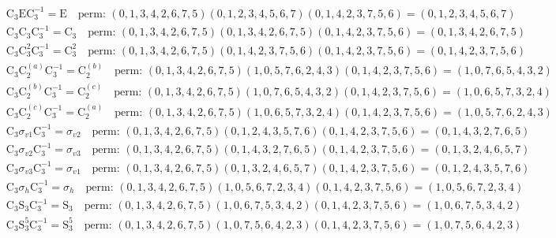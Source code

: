 \begin{align*}
& \mathrm{C}_{3} \mathrm{E} \mathrm{C}_{3}^{-1} = \mathrm{E} \quad \text{perm: }(0, 1, 3, 4, 2, 6, 7, 5)(0, 1, 2, 3, 4, 5, 6, 7)(0, 1, 4, 2, 3, 7, 5, 6) = (0, 1, 2, 3, 4, 5, 6, 7) \\
& \mathrm{C}_{3} \mathrm{C}_{3} \mathrm{C}_{3}^{-1} = \mathrm{C}_{3} \quad \text{perm: }(0, 1, 3, 4, 2, 6, 7, 5)(0, 1, 3, 4, 2, 6, 7, 5)(0, 1, 4, 2, 3, 7, 5, 6) = (0, 1, 3, 4, 2, 6, 7, 5) \\
& \mathrm{C}_{3} \mathrm{C}_{3}^{2} \mathrm{C}_{3}^{-1} = \mathrm{C}_{3}^{2} \quad \text{perm: }(0, 1, 3, 4, 2, 6, 7, 5)(0, 1, 4, 2, 3, 7, 5, 6)(0, 1, 4, 2, 3, 7, 5, 6) = (0, 1, 4, 2, 3, 7, 5, 6) \\
& \mathrm{C}_{3} \mathrm{C}_{2}^{(a)} \mathrm{C}_{3}^{-1} = \mathrm{C}_{2}^{(b)} \quad \text{perm: }(0, 1, 3, 4, 2, 6, 7, 5)(1, 0, 5, 7, 6, 2, 4, 3)(0, 1, 4, 2, 3, 7, 5, 6) = (1, 0, 7, 6, 5, 4, 3, 2) \\
& \mathrm{C}_{3} \mathrm{C}_{2}^{(b)} \mathrm{C}_{3}^{-1} = \mathrm{C}_{2}^{(c)} \quad \text{perm: }(0, 1, 3, 4, 2, 6, 7, 5)(1, 0, 7, 6, 5, 4, 3, 2)(0, 1, 4, 2, 3, 7, 5, 6) = (1, 0, 6, 5, 7, 3, 2, 4) \\
& \mathrm{C}_{3} \mathrm{C}_{2}^{(c)} \mathrm{C}_{3}^{-1} = \mathrm{C}_{2}^{(a)} \quad \text{perm: }(0, 1, 3, 4, 2, 6, 7, 5)(1, 0, 6, 5, 7, 3, 2, 4)(0, 1, 4, 2, 3, 7, 5, 6) = (1, 0, 5, 7, 6, 2, 4, 3) \\
& \mathrm{C}_{3} \sigma_{v1} \mathrm{C}_{3}^{-1} = \sigma_{v2} \quad \text{perm: }(0, 1, 3, 4, 2, 6, 7, 5)(0, 1, 2, 4, 3, 5, 7, 6)(0, 1, 4, 2, 3, 7, 5, 6) = (0, 1, 4, 3, 2, 7, 6, 5) \\
& \mathrm{C}_{3} \sigma_{v2} \mathrm{C}_{3}^{-1} = \sigma_{v3} \quad \text{perm: }(0, 1, 3, 4, 2, 6, 7, 5)(0, 1, 4, 3, 2, 7, 6, 5)(0, 1, 4, 2, 3, 7, 5, 6) = (0, 1, 3, 2, 4, 6, 5, 7) \\
& \mathrm{C}_{3} \sigma_{v3} \mathrm{C}_{3}^{-1} = \sigma_{v1} \quad \text{perm: }(0, 1, 3, 4, 2, 6, 7, 5)(0, 1, 3, 2, 4, 6, 5, 7)(0, 1, 4, 2, 3, 7, 5, 6) = (0, 1, 2, 4, 3, 5, 7, 6) \\
& \mathrm{C}_{3} \sigma_{h} \mathrm{C}_{3}^{-1} = \sigma_{h} \quad \text{perm: }(0, 1, 3, 4, 2, 6, 7, 5)(1, 0, 5, 6, 7, 2, 3, 4)(0, 1, 4, 2, 3, 7, 5, 6) = (1, 0, 5, 6, 7, 2, 3, 4) \\
& \mathrm{C}_{3} \mathrm{S}_{3} \mathrm{C}_{3}^{-1} = \mathrm{S}_{3} \quad \text{perm: }(0, 1, 3, 4, 2, 6, 7, 5)(1, 0, 6, 7, 5, 3, 4, 2)(0, 1, 4, 2, 3, 7, 5, 6) = (1, 0, 6, 7, 5, 3, 4, 2) \\
& \mathrm{C}_{3} \mathrm{S}_{3}^{5} \mathrm{C}_{3}^{-1} = \mathrm{S}_{3}^{5} \quad \text{perm: }(0, 1, 3, 4, 2, 6, 7, 5)(1, 0, 7, 5, 6, 4, 2, 3)(0, 1, 4, 2, 3, 7, 5, 6) = (1, 0, 7, 5, 6, 4, 2, 3) \\

\end{align*}
